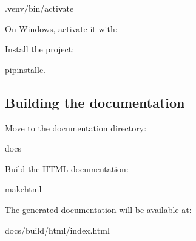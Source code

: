 \documentclass[letterpaper,10pt,english]{sphinxmanual}
\begin{document}
\begin{sphinxVerbatim}[commandchars=\\\{\}]
.venv/bin/activate
\end{sphinxVerbatim}

\sphinxAtStartPar
On Windows, activate it with:

\begin{sphinxVerbatim}[commandchars=\\\{\}]
\end{sphinxVerbatim}

\sphinxAtStartPar
Install the project:

\begin{sphinxVerbatim}[commandchars=\\\{\}]
pipinstall\PYGZhy{}e.
\end{sphinxVerbatim}


\subsection{Building the documentation}
\label{\detokenize{installation:building-the-documentation}}
\sphinxAtStartPar
Move to the documentation directory:

\begin{sphinxVerbatim}[commandchars=\\\{\}]
docs
\end{sphinxVerbatim}

\sphinxAtStartPar
Build the HTML documentation:

\begin{sphinxVerbatim}[commandchars=\\\{\}]
makehtml
\end{sphinxVerbatim}

\sphinxAtStartPar
The generated documentation will be available at:

\begin{sphinxVerbatim}[commandchars=\\\{\}]
docs/\PYGZus{}build/html/index.html
\end{sphinxVerbatim}

\sphinxstepscope
\end{document}
